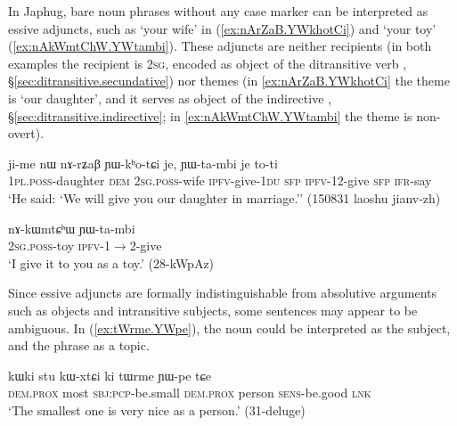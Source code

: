 In Japhug, bare noun phrases without any case marker can be interpreted as essive adjuncts, such as  `your wife' in (\ref{ex:nArZaB.YWkhotCi}) and  `your toy' (\ref{ex:nAkWmtChW.YWtambi}). These adjuncts are neither recipients (in both examples the recipient is \textsc{2sg}, encoded as object of the ditransitive verb , §\ref{sec:ditransitive.secundative}) nor themes (in \ref{ex:nArZaB.YWkhotCi} the theme is  `our daughter', and it serves as object of the indirective , §\ref{sec:ditransitive.indirective}; in \ref{ex:nAkWmtChW.YWtambi} the theme is non-overt).

\begin{exe}
\ex \label{ex:nArZaB.YWkhotCi}
\gll  ji-me nɯ nɤ-rʑaβ ɲɯ-kʰo-tɕi je, ɲɯ-ta-mbi je to-ti\\
 \textsc{1pl}.\textsc{poss}-daughter \textsc{dem} \textsc{2sg}.\textsc{poss}-wife \textsc{ipfv}-give-\textsc{1du} \textsc{sfp} \textsc{ipfv}-1\fl{}2-give \textsc{sfp} \textsc{ifr}-say \\
 \glt `He said: `We will give you our daughter in marriage.'' (150831 laoshu jianv-zh)
\end{exe} 

\begin{exe}
\ex \label{ex:nAkWmtChW.YWtambi}
\gll  nɤ-kɯmtɕʰɯ ɲɯ-ta-mbi \\
 \textsc{2sg}.\textsc{poss}-toy \textsc{ipfv}-1$\rightarrow$2-give   \\
 \glt `I give it to you as a toy.' (28-kWpAz) 
\end{exe}

Since essive adjuncts are formally indistinguishable from absolutive arguments such as objects and intransitive subjects, some sentences may appear to be ambiguous. In (\ref{ex:tWrme.YWpe}), the noun  could be interpreted as the subject, and the phrase  as a topic.

\begin{exe}
\ex \label{ex:tWrme.YWpe}
\gll kɯki stu kɯ-xtɕi ki tɯrme ɲɯ-pe tɕe \\
\textsc{dem}.\textsc{prox} most \textsc{sbj}:\textsc{pcp}-be.small \textsc{dem}.\textsc{prox} person \textsc{sens}-be.good \textsc{lnk} \\
\glt `The smallest one is very nice as a person.' (31-deluge)
\end{exe}

